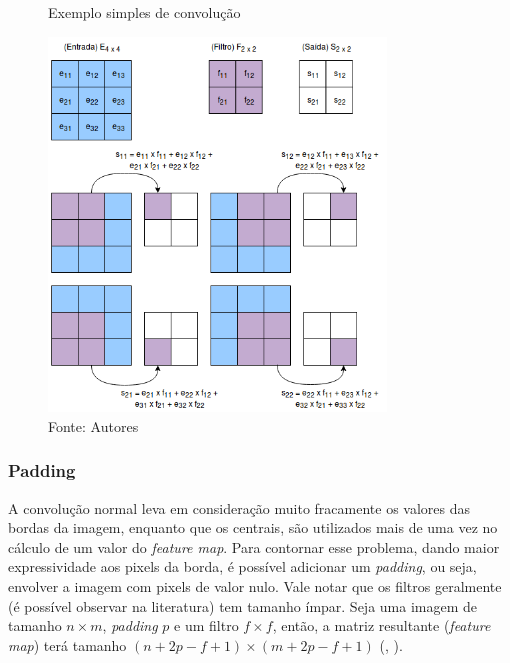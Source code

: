 \documentclass[]{politex}
\begin{document}
\begin{figure}[H]
    \centering
    \caption{Exemplo simples de convolução}
    \includegraphics[width=0.8\textwidth]{Convolucao}
    \caption*{Fonte: Autores}
    \label{fig:convolucao}
\end{figure}

\subsubsection{Padding}
A convolução normal leva em consideração muito fracamente os valores das bordas da imagem, enquanto que os centrais, são utilizados mais de uma vez no cálculo de um valor do \textit{feature map}. Para contornar esse problema, dando maior expressividade aos pixels da borda, é possível adicionar um \textit{padding}, ou seja, envolver a imagem com pixels de valor nulo. Vale notar que os filtros geralmente (é possível observar na literatura) tem tamanho ímpar. Seja uma imagem de tamanho \(n \times m\), \textit{padding} \(p\) e um filtro \(f \times f\), então, a matriz resultante (\textit{feature map}) terá tamanho \((n+2p-f+1) \times (m+2p-f+1)\) (, \citeyear{cnncourse}).
\end{document}
